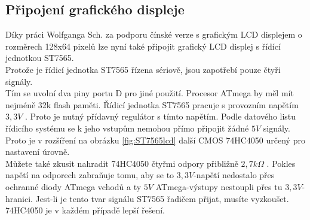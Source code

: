 \subsection{Připojení grafického displeje}
\vspace{-0.2cm}
Díky práci Wolfganga Sch. za podporu čínské verze s grafickým LCD displejem o rozměrech 128x64 pixelů
lze nyní také připojit grafický LCD displej s řídící jednotkou ST7565.\\ Protože je řídicí jednotka ST7565 řízena sériově, jsou zapotřebí pouze čtyři signály.\\
Tím se uvolní dva piny portu D pro jiné použití.
Procesor ATmega by měl mít nejméně 32k flash paměti.
Řídicí jednotka ST7565 pracuje s provozním napětím \(3,3V\) .
Proto je nutný přídavný regulátor s tímto napětím.
Podle datového listu řídicího systému se k jeho vstupům nemohou přímo připojit žádné \(5V\) signály.
Proto je v rozšíření na obrázku \ref{fig:ST7565lcd} další CMOS 74HC4050
určený pro nastavení úrovně.\\ 
Můžete také zkusit nahradit 74HC4050 čtyřmi odpory přibližně \(2,7k\Omega\) .
Pokles napětí na odporech zabraňuje tomu, aby se to  \(3,3V\)-napětí nedostalo přes ochranné diody
ATmega vchodů a ty \(5V\) ATmega-výstupy nestoupli přes tu \(3,3V\)-hranici.
Jest-li je tento tvar signálu ST7565 řadičem přijat, musíte vyzkoušet. 74HC4050 je v každém
případě lepší řešení.\\
 
